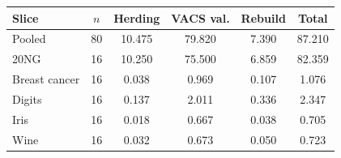\begin{tabular}{lccccc}
\toprule
Slice & $n$ & Herding & VACS val. & Rebuild & Total \\
\midrule
Pooled & 80 & 10.475 & 79.820 & 7.390 & 87.210 \\
20NG & 16 & 10.250 & 75.500 & 6.859 & 82.359 \\
Breast cancer & 16 & 0.038 & 0.969 & 0.107 & 1.076 \\
Digits & 16 & 0.137 & 2.011 & 0.336 & 2.347 \\
Iris & 16 & 0.018 & 0.667 & 0.038 & 0.705 \\
Wine & 16 & 0.032 & 0.673 & 0.050 & 0.723 \\
\bottomrule
\end{tabular}
